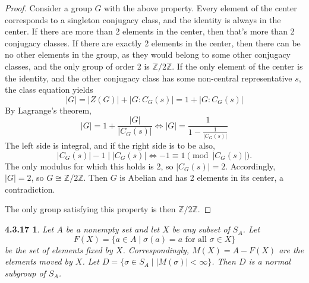 \documentclass{article}
\newtheorem*{4.3.17}{4.3.17}
\begin{document}
\begin{proof}
  Consider a group $G$ with the above property.
  Every element of the center corresponds to a singleton conjugacy class, and the identity is always in the center.
  If there are more than 2 elements in the center, then that's more than 2 conjugacy classes.
  If there are exactly 2 elements in the center, then there can be no other elements in the group,
  as they would belong to some other conjugacy classes, and the only group of order 2 is $\mathbb{Z} / 2\mathbb{Z}$.
  If the only element of the center is the identity, and the other conjugacy class has some non-central representative $s$,
  the class equation yields
  \[
    |G| = |Z(G)| + |G : C_{G}(s)| = 1 + |G : C_{G}(s)|
  \]
  By Lagrange's theorem,
  \[
    |G| = 1 + \frac{|G|}{|C_{G}(s)|}
    \Leftrightarrow |G| = \frac{1}{1 - \frac{1}{|C_{G}(s)|}}
  \]
  The left side is integral, and if the right side is to be also,
  \[
    |C_{G}(s)| - 1 \mid |C_{G}(s)| \Leftrightarrow -1 \equiv 1 \pmod {|C_{G}(s)|}.
  \]
  The only modulus for which this holds is 2, so $|C_{G}(s)| = 2$.
  Accordingly, $|G| = 2$, so $G \cong \mathbb{Z} / 2\mathbb{Z}$.
  Then $G$ is Abelian and has 2 elements in its center, a contradiction.

  The only group satisfying this property is then $\mathbb{Z} / 2\mathbb{Z}$.
\end{proof}

\begin{4.3.17}
  Let $A$ be a nonempty set and let $X$ be any subset of $S_{A}$.
  Let
  \[
    F(X) = \{a \in A \mid \sigma(a) = a \textrm{ for all } \sigma \in X\}
  \]
  be the set of elements fixed by $X$.
  Correspondingly, $M(X) = A - F(X)$ are the elements moved by $X$.
  Let $D = \{\sigma \in S_{A} \mid |M(\sigma)| < \infty\}$.
  Then $D$ is a normal subgroup of $S_{A}$.
\end{4.3.17}
\end{document}
